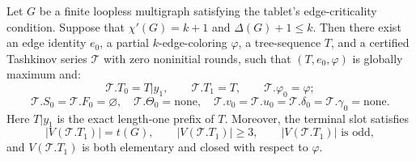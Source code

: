 \begin{theorem}
Let \(G\) be a finite loopless multigraph satisfying the tablet's
edge-criticality condition.  Suppose that
\(\chi'(G)=k+1\) and \(\Delta(G)+1\leq k\).  Then there exist an edge
identity \(e_0\), a partial \(k\)-edge-coloring \(\varphi\), a tree-sequence
\(T\), and a certified Tashkinov series \(\mathcal T\) with zero
noninitial rounds, such that \((T,e_0,\varphi)\) is globally maximum and:
\[
 \mathcal T.T_0=T|y_1,\qquad
 \mathcal T.T_1=T,\qquad
 \mathcal T.\varphi_0=\varphi;
\]
\[
 \mathcal T.S_0=\mathcal T.F_0=\varnothing,
 \quad \mathcal T.\Theta_0=\mathrm{none},
 \quad \mathcal T.v_0=\mathcal T.u_0=
 \mathcal T.\delta_0=\mathcal T.\gamma_0=\mathrm{none}.
\]
Here \(T|y_1\) is the exact length-one prefix of \(T\).  Moreover, the
terminal slot satisfies
\[
 |V(\mathcal T.T_1)|=t(G),\qquad |V(\mathcal T.T_1)|\geq3,
 \qquad |V(\mathcal T.T_1)|\text{ is odd},
\]
and \(V(\mathcal T.T_1)\) is both elementary and closed with respect to
\(\varphi\).
\end{theorem}
